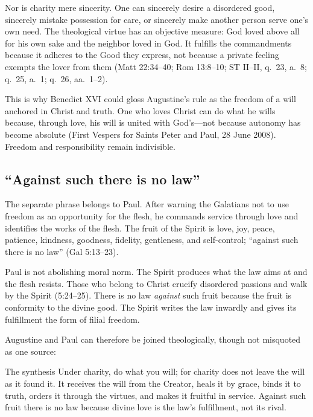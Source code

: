 Nor is charity mere sincerity. One can sincerely desire a disordered good, sincerely mistake possession for care, or sincerely make another person serve one's own need. The theological virtue has an objective measure: God loved above all for his own sake and the neighbor loved in God. It fulfills the commandments because it adheres to the Good they express, not because a private feeling exempts the lover from them (Matt 22:34--40; Rom 13:8--10; ST II--II, q.~23, a.~8; q.~25, a.~1; q.~26, aa.~1--2).

This is why Benedict XVI could gloss Augustine's rule as the freedom of a will anchored in Christ and truth. One who loves Christ can do what he wills because, through love, his will is united with God's---not because autonomy has become absolute (First Vespers for Saints Peter and Paul, 28 June 2008). Freedom and responsibility remain indivisible.

\subsection{``Against such there is no law''}

The separate phrase belongs to Paul. After warning the Galatians not to use freedom as an opportunity for the flesh, he commands service through love and identifies the works of the flesh. The fruit of the Spirit is love, joy, peace, patience, kindness, goodness, fidelity, gentleness, and self-control; ``against such there is no law'' (Gal 5:13--23).

Paul is not abolishing moral norm. The Spirit produces what the law aims at and the flesh resists. Those who belong to Christ crucify disordered passions and walk by the Spirit (5:24--25). There is no law \emph{against} such fruit because the fruit is conformity to the divine good. The Spirit writes the law inwardly and gives its fulfillment the form of filial freedom.

Augustine and Paul can therefore be joined theologically, though not misquoted as one source:

\begin{studybox}{The synthesis}
Under charity, do what you will; for charity does not leave the will as it found it. It receives the will from the Creator, heals it by grace, binds it to truth, orders it through the virtues, and makes it fruitful in service. Against such fruit there is no law because divine love is the law's fulfillment, not its rival.
\end{studybox}

